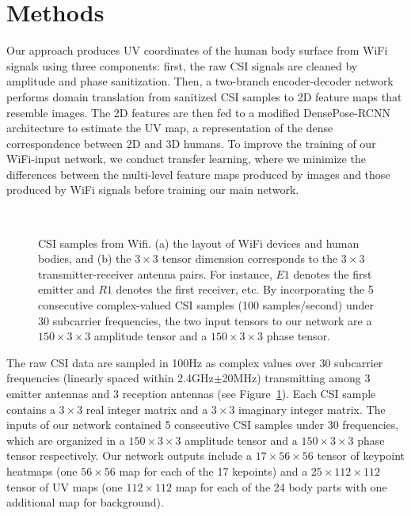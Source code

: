 \documentclass[sigconf, anonymous=false]{acmart}
\begin{document}
\section{Methods}
Our approach produces UV coordinates of the human body surface from WiFi signals using three components:
first, the raw CSI signals are cleaned by amplitude and phase sanitization. Then, a two-branch encoder-decoder network performs domain translation from sanitized CSI samples to 2D feature maps that resemble images. The 2D features are then fed to a modified DensePose-RCNN architecture \cite{DensePose} to estimate the UV map, a representation of the dense correspondence between 2D and 3D humans. To improve the training of our WiFi-input network, we conduct transfer learning, where we minimize the differences between the multi-level feature maps produced by images and those produced by WiFi signals before training our main network. 
 
 \begin{figure}[!htb]
\centering
{}\ %
%
\caption{CSI samples from Wifi. (a) the layout of WiFi devices and human bodies, and (b) the $3 \times 3$ tensor dimension corresponds to the $3 \times 3$ transmitter-receiver antenna pairs. For instance, $E1$ denotes the first emitter and $R1$ denotes the first receiver, etc. By incorporating the 5 consecutive complex-valued CSI samples (100 samples/second) under 30 subcarrier frequencies, the two input tensors to our network are a $150 \times 3 \times 3$ amplitude tensor and a $150 \times 3 \times 3$ phase tensor.} %
\label{fig:CSIrepresenation}
\end{figure}
 
The raw CSI data are sampled in 100Hz as complex values over 30 subcarrier frequencies (linearly spaced within 2.4GHz$\pm$20MHz) transmitting among 3 emitter antennas and 3 reception antennas (see Figure~\ref{fig:CSIrepresenation}). Each CSI sample contains a $3 \times 3$ real integer matrix and a $3 \times 3$ imaginary integer matrix. The inputs of our network contained 5 consecutive CSI samples under 30 frequencies, which are organized in a $150 \times 3 \times 3$ amplitude tensor and a $150 \times 3 \times 3$ phase tensor respectively. Our network outputs include a $17 \times 56 \times 56$ tensor of keypoint heatmaps (one $56 \times 56$ map for each of the 17 kepoints) and a $25 \times 112 \times 112$ tensor of UV maps (one $112 \times 112$ map for each of the 24 body parts with one additional map for background). 
 
\end{document}
